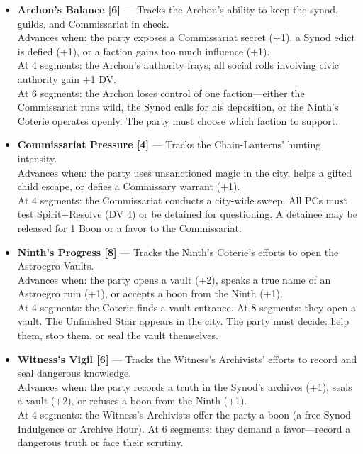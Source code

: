\begin{itemize}
\item \textbf{Archon's Balance [6]} --- Tracks the Archon's ability to keep the synod, guilds, and Commissariat in check.\\
  Advances when: the party exposes a Commissariat secret (+1), a Synod edict is defied (+1), or a faction gains too much influence (+1).\\
  At 4 segments: the Archon's authority frays; all social rolls involving civic authority gain +1 DV.\\
  At 6 segments: the Archon loses control of one faction---either the Commissariat runs wild, the Synod calls for his deposition, or the Ninth's Coterie operates openly. The party must choose which faction to support.

\item \textbf{Commissariat Pressure [4]} --- Tracks the Chain-Lanterns' hunting intensity.\\
  Advances when: the party uses unsanctioned magic in the city, helps a gifted child escape, or defies a Commissary warrant (+1).\\
  At 4 segments: the Commissariat conducts a city-wide sweep. All PCs must test Spirit+Resolve (DV 4) or be detained for questioning. A detainee may be released for 1 Boon or a favor to the Commissariat.

\item \textbf{Ninth's Progress [8]} --- Tracks the Ninth's Coterie's efforts to open the Astroegro Vaults.\\
  Advances when: the party opens a vault (+2), speaks a true name of an Astroegro ruin (+1), or accepts a boon from the Ninth (+1).\\
  At 4 segments: the Coterie finds a vault entrance. At 8 segments: they open a vault. The Unfinished Stair appears in the city. The party must decide: help them, stop them, or seal the vault themselves.

\item \textbf{Witness's Vigil [6]} --- Tracks the Witness's Archivists' efforts to record and seal dangerous knowledge.\\
  Advances when: the party records a truth in the Synod's archives (+1), seals a vault (+2), or refuses a boon from the Ninth (+1).\\
  At 4 segments: the Witness's Archivists offer the party a boon (a free Synod Indulgence or Archive Hour). At 6 segments: they demand a favor---record a dangerous truth or face their scrutiny.
\end{itemize}

